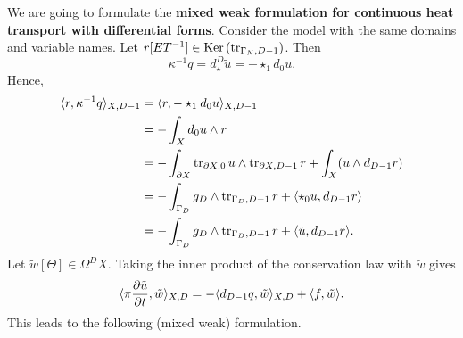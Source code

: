 \begin{discussion}
  We are going to formulate the \textbf{mixed weak formulation for continuous
  heat transport with differential forms}.
  Consider the model
  with the same domains and variable names.
  Let $r [E T^{-1}] \in \mathop{\rm Ker}\nolimits \left(\mathop{\rm tr}\nolimits_{\Gamma_N, D - 1}\right)$.
  Then
  \begin{equation}
    \kappa^{-1} q = d_\star^D \tilde{u} = - \star_1 d_0 u.
  \end{equation}
  Hence,
  \begin{equation}
    \begin{split}
      \langle r,\kappa^{-1} q\rangle_{X, D - 1}
      & = \langle r,- \star_1 d_0 u\rangle_{X, D - 1} \\
      & = - \int_X d_0 u \wedge r \\
      & = - \int_{\partial X}
        \mathop{\rm tr}\nolimits_{\partial X, 0} u \wedge \mathop{\rm tr}\nolimits_{\partial X, D - 1} r
        + \int_{X} (u \wedge d_{D - 1} r) \\
      & = - \int_{\Gamma_D} g_D \wedge \mathop{\rm tr}\nolimits_{\Gamma_D, D - 1} r
        + \langle\star_0 u,d_{D - 1} r\rangle \\
      & = - \int_{\Gamma_D} g_D \wedge \mathop{\rm tr}\nolimits_{\Gamma_D, D - 1} r
        + \langle\tilde{u},d_{D - 1} r\rangle.
    \end{split}
  \end{equation}
  Let $\tilde{w} [\Theta] \in \Omega^D X$.
  Taking the inner product of the conservation law with $\tilde{w}$ gives
  \begin{equation}
   \langle\pi \frac{\partial \tilde{u}}{\partial t},\tilde{w}\rangle_{X, D}
    = - \langle d_{D - 1} q,\tilde{w}\rangle_{X, D} + \langle f,\tilde{w}\rangle.
  \end{equation}
  This leads to the following (mixed weak) formulation.
\end{discussion}
